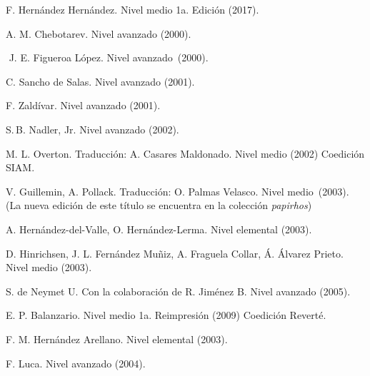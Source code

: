 F. Hernández Hernández.
Nivel medio
1a. Edición
(2017).

A. M. Chebotarev. 
Nivel avanzado 
(2000). %

$\!$
J.$\!$ E. Figueroa López.$\!$
Nivel avanzado~(2000). %

C. Sancho de Salas.
Nivel avanzado
(2001). %

F. Zaldívar.
Nivel avanzado
(2001). %

S.\,B. Nadler, Jr. 
Nivel avanzado 
(2002). %

M. L. Overton. 
Traducción: A. Casares Maldonado.
Nivel medio 
(2002) %
Coedición SIAM.

V. Guillemin, A. Pollack.
Traducción: O.$\!$ Palmas Velasco.
Nivel medio~(2003).\\ %
(La nueva edición de este título se encuentra en la colección {\itshape papirhos})

A. Hernández-del-Valle, O. Hernández-Lerma.
Nivel elemental 
(2003). %

D. Hinrichsen, J. L. Fernández Muñiz, A.
Fraguela Collar, Á. Álvarez Prieto. 
Nivel medio 
(2003). %

S. de Neymet U. Con la colaboración de R. Jiménez B.
Nivel avanzado 
(2005). %

E. P. Balanzario. 
Nivel medio 
1a. Reimpresión
(2009) Coedición Reverté.

F. M. Hernández Arellano.
Nivel elemental
(2003). %

F. Luca.
Nivel avanzado
(2004).


